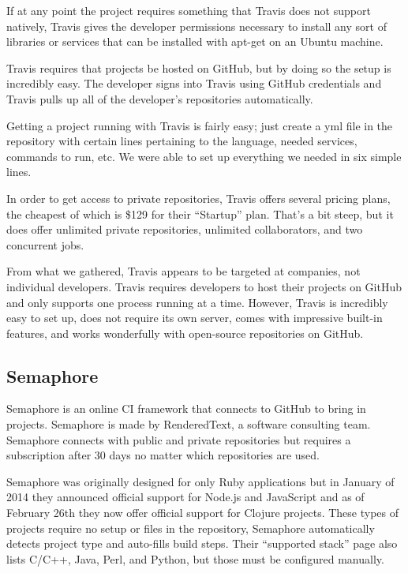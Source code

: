 \documentclass[12pt]{ucthesis}
\begin{document}
If at any point the project requires something that Travis does not support natively, Travis gives the developer permissions necessary to install any sort of libraries or services that can be installed with apt-get on an Ubuntu machine.

Travis requires that projects be hosted on GitHub, but by doing so the setup is incredibly easy. The developer signs into Travis using GitHub credentials and Travis pulls up all of the developer's repositories automatically. 

Getting a project running with Travis is fairly easy; just create a yml file in the repository with certain lines pertaining to the language, needed services, commands to run, etc. We were able to set up everything we needed in six simple lines.

In order to get access to private repositories, Travis offers several pricing plans, the cheapest of which is \$129 for their ``Startup'' plan\cite{TravisPricing}. That's a bit steep, but it does offer unlimited private repositories, unlimited collaborators, and two concurrent jobs. 

From what we gathered, Travis appears to be targeted at companies, not individual developers. Travis requires developers to host their projects on GitHub and only supports one process running at a time. However, Travis is incredibly easy to set up, does not require its own server, comes with impressive built-in features, and works wonderfully with open-source repositories on GitHub.

\subsection{Semaphore}
Semaphore\cite{Semaphore} is an online CI framework that connects to GitHub to bring in projects. Semaphore is made by RenderedText, a software consulting team. Semaphore connects with public and private repositories but requires a subscription after 30 days no matter which repositories are used.

Semaphore was originally designed for only Ruby applications but in January of 2014 they announced official support for Node.js and JavaScript and as of February 26th they now offer official support for Clojure projects\cite{SemaphoreBlog}. These types of projects require no setup or files in the repository, Semaphore automatically detects project type and auto-fills build steps. Their ``supported stack'' page also lists C/C++, Java, Perl, and Python, but those must be configured manually. 
\end{document}
